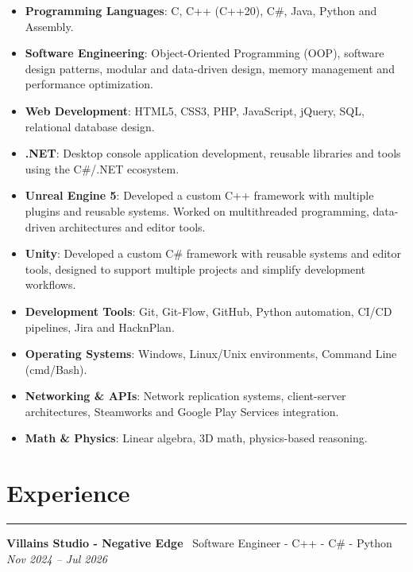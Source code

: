 \documentclass[8.5pt]{article}
\newcommand{\sectionline}{
    \vspace{0pt}
    \hrule
    \vspace{2pt}
}
\newcommand{\cvsection}[1]{
    \section*{#1}
    \sectionline
}
\begin{document}
    \begin{itemize}
        \item
        \textbf{Programming Languages}: C, C++ (C++20), C\#, Java, Python and Assembly.

        \item
        \textbf{Software Engineering}: Object-Oriented Programming (OOP), software design patterns, modular and data-driven design, memory management and performance optimization.

        \item
        \textbf{Web Development}: HTML5, CSS3, PHP, JavaScript, jQuery, SQL, relational database design.

        \item
        \textbf{.NET}: Desktop console application development, reusable libraries and tools using the C\#/.NET ecosystem.

        \item
        \textbf{Unreal Engine 5}: Developed a custom C++ framework with multiple plugins and reusable systems.
        Worked on multithreaded programming, data-driven architectures and editor tools.

        \item
        \textbf{Unity}: Developed a custom C\# framework with reusable systems and editor tools,
        designed to support multiple projects and simplify development workflows.

        \item
        \textbf{Development Tools}: Git, Git-Flow, GitHub, Python automation, CI/CD pipelines, Jira and HacknPlan.

        \item
        \textbf{Operating Systems}: Windows, Linux/Unix environments, Command Line (cmd/Bash).

        \item
        \textbf{Networking \& APIs}: Network replication systems, client-server architectures, Steamworks and Google Play Services integration.
        
        \item
        \textbf{Math \& Physics}: Linear algebra, 3D math, physics-based reasoning.
    \end{itemize}


    \cvsection{Experience}

    \textbf{Villains Studio - Negative Edge} \textemdash\ Software Engineer - C++ - C\# - Python
    \hfill
    \textit{Nov 2024 -- Jul 2026}
\end{document}
